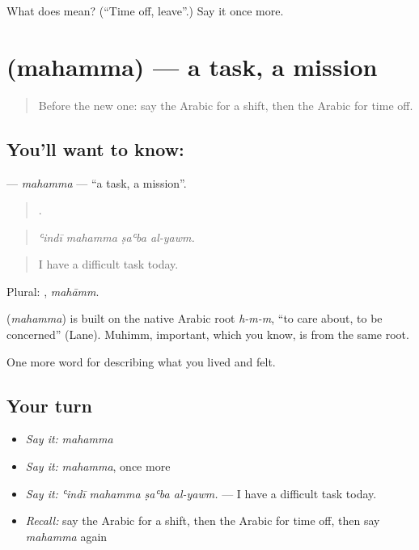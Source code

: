 \begin{tcolorbox}[breakable,colback=teal!4,colframe=teal!35!black,title={Before you move on}]
What does  mean? (\textquotedblleft{}Time off, leave\textquotedblright{}.) Say it once more.
\end{tcolorbox}
\section[\texorpdfstring{\ar{مهمة} (mahamma)}{مهمة (mahamma)}]{ (mahamma) — a task, a mission}

\label{lesson:AR-C520-mahamma}



\begin{quote}
Before the new one: say the Arabic for a shift, then the Arabic for time off.
\end{quote}

\subsection*{You'll want to know: }
\textbf{} — \emph{mahamma} — \textquotedblleft{}a task, a mission\textquotedblright{}.

\begin{quote}
   .
\end{quote}

\begin{quote}
\emph{ʿindī mahamma ṣaʿba al-yawm.}
\end{quote}

\begin{quote}
I have a difficult task today.
\end{quote}

Plural: , \emph{mahāmm}.

\begin{cousinweb}
\textbf{} (\emph{mahamma}) is built on the native Arabic root \emph{h-m-m}, \textquotedblleft{}to care about, to be concerned\textquotedblright{} (Lane). Muhimm, important, which you know, is from the same root.
\end{cousinweb}

\begin{grammarlens}[title={What you've built}]
One more word for describing what you lived and felt.
\end{grammarlens}

\subsection*{Your turn}
\begin{itemize}
\raggedright
  \item \emph{Say it:} \emph{mahamma}
  \item \emph{Say it:} \emph{mahamma}, once more
  \item \emph{Say it:} \emph{ʿindī mahamma ṣaʿba al-yawm.} — I have a difficult task today.
  \item \emph{Recall:} say the Arabic for a shift, then the Arabic for time off, then say \emph{mahamma} again
\end{itemize}

